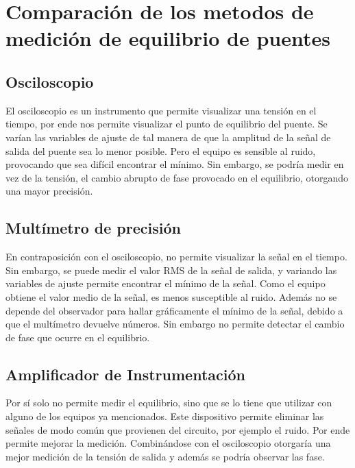 \documentclass[../../main.tex]{subfiles}
\begin{document}
\section{Comparación de los metodos  de medición de equilibrio de puentes}
\subsection*{Osciloscopio}
\par El osciloscopio es un instrumento que permite visualizar una tensión en el tiempo, por ende nos permite visualizar el punto de equilibrio del puente. Se varían las variables de ajuste de tal manera de que la amplitud de la señal de salida del puente sea lo menor posible. Pero el equipo es sensible al ruido, provocando que sea difícil encontrar el mínimo. Sin embargo, se podría medir en vez de la tensión, el cambio abrupto de fase provocado en el equilibrio, otorgando una mayor precisión.
\subsection*{Multímetro de precisión}
\par En contraposición con el osciloscopio, no permite visualizar la señal en el tiempo. Sin embargo, se puede medir el valor RMS de la señal de salida, y variando las variables de ajuste permite encontrar el mínimo de la señal. Como el equipo obtiene el valor medio de la señal, es menos susceptible al ruido. Además no se depende del observador para hallar gráficamente el mínimo de la señal, debido a que el multímetro devuelve números. Sin embargo no permite detectar el cambio de fase que ocurre en el equilibrio.
\subsection*{Amplificador de Instrumentación}
\par Por s\'i solo no permite medir el equilibrio, sino que se lo tiene que utilizar con alguno de los equipos ya mencionados. Este dispositivo permite eliminar las señales de modo común que provienen del circuito, por ejemplo el ruido. Por ende permite mejorar la medición. Combinándose con el osciloscopio otorgaría una mejor medición de la tensión de salida y además se podría observar las fase.
\end{document}
